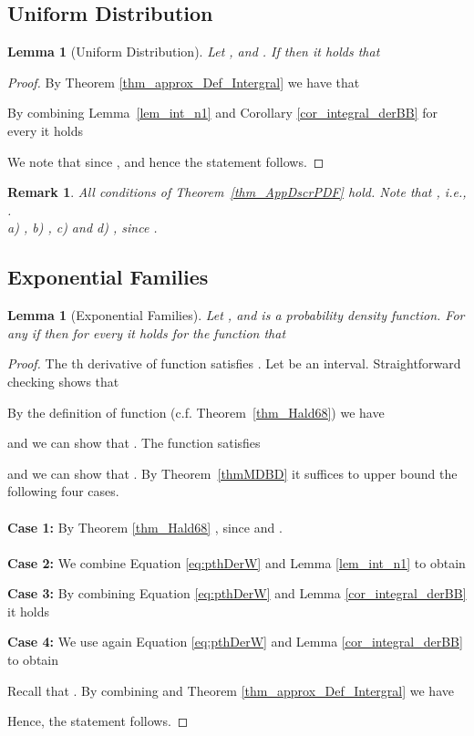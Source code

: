 \documentclass[11pt]{article}
\newtheorem{lem}[thm]{Lemma}
\newtheorem{rem}[thm]{Remark}
\numberwithin{thm}{section}
\begin{document}
\subsection{Uniform Distribution}

\begin{lem}[Uniform Distribution]\label{lem_Approx_Bni}
Let ,  and . If  then it holds that

\end{lem}

\begin{proof}
By Theorem \ref{thm_approx_Def_Intergral} we have that

By combining Lemma~\ref{lem_int_n1} and Corollary \ref{cor_integral_derBB} for every 
it holds

We note that  since , and hence the statement follows.
\end{proof}

\begin{rem}
All conditions of Theorem~\ref{thm_AppDscrPDF} hold. Note that , i.e., .\\
a) , b) , c)  and d) , since .
\end{rem}


\subsection{Exponential Families}

\begin{lem}[Exponential Families]\label{lem_approxExpFam}
Let ,  and 
is a probability density function. For any  if  then for every  it holds for the function
 that

\end{lem}

\begin{proof}
The th derivative of function  satisfies . Let  be an interval. Straightforward checking shows that

By the definition of function  (c.f. Theorem~\ref{thm_Hald68}) we have

and we can show that . The function  satisfies

and we can show that . By Theorem~\ref{thmMDBD} it suffices to upper bound the following four cases.\\
\\
\textbf{Case 1:} By Theorem \ref{thm_Hald68} , since 
and .\\
\\
\textbf{Case 2:} We combine Equation \ref{eq:pthDerW}
and Lemma \ref{lem_int_n1} to obtain

\textbf{Case 3:} By combining Equation \ref{eq:pthDerW} and Lemma \ref{cor_integral_derBB} it holds

\textbf{Case 4:} We use again Equation \ref{eq:pthDerW} and Lemma \ref{cor_integral_derBB} to obtain

Recall that . By combining  and Theorem \ref{thm_approx_Def_Intergral} we have

Hence, the statement follows.
\end{proof}
\end{document}
